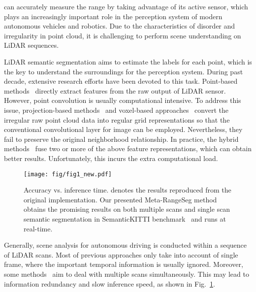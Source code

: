 \documentclass[letterpaper, 10 pt, journal, twoside]{ieeetran}
\begin{document}
 can accurately measure the range by taking advantage of its active sensor, which plays an increasingly important role in the perception system of modern autonomous vehicles and robotics. Due to the characteristics of disorder and irregularity in point cloud, it is challenging to perform scene understanding on LiDAR sequences.

LiDAR semantic segmentation aims to estimate the labels for each point, which is the key to understand the surroundings for the perception system. During past decade, extensive research efforts have been devoted to this task. Point-based methods~\cite{qi2017pointnet, qi2017pointnet++, hu2020randla} directly extract features from the raw output of LiDAR sensor. However, point convolution is usually computational intensive. To address this issue, projection-based methods~\cite{wu2019squeezesegv2,milioto2019rangenet++,cortinhal2020salsanext} and voxel-based approaches~\cite{graham20183d, yan2021sparse, zhu2021cylindrical} convert the irregular raw point cloud data into regular grid representations so that the conventional convolutional layer for image can be employed. Nevertheless, they fail to preserve the original neighborhood relationship. In practice, the hybrid methods~\cite{zhang2020deep, tang2020searching, xu2021rpvnet} fuse two or more of the above feature representations, which can obtain better results. Unfortunately, this incurs the extra computational load. 

\begin{figure}
\centering
\setlength{\abovecaptionskip}{-0.2cm}
\texttt{[image: fig/fig1\_new.pdf]}
    \caption{Accuracy vs. inference time.  denotes the results reproduced from the original implementation. Our presented Meta-RangeSeg method obtains the promising results on both multiple scans and single scan semantic segmentation in SemanticKITTI benchmark~\cite{behley2019semantickitti} and runs at real-time.}
    \label{fig:first}
    \vspace{-6mm}
\end{figure}


Generally, scene analysis for autonomous driving is conducted within a sequence of LiDAR scans. Most of previous approaches only take into account of single frame, where the important temporal information is usually ignored. Moreover, some methods~\cite{sun2021pointmoseg, shi2020spsequencenet, zhu2021cylindrical} aim to deal with multiple scans simultaneously. This may lead to information redundancy and slow inference speed, as shown in Fig.~\ref{fig:first}. 
\end{document}
